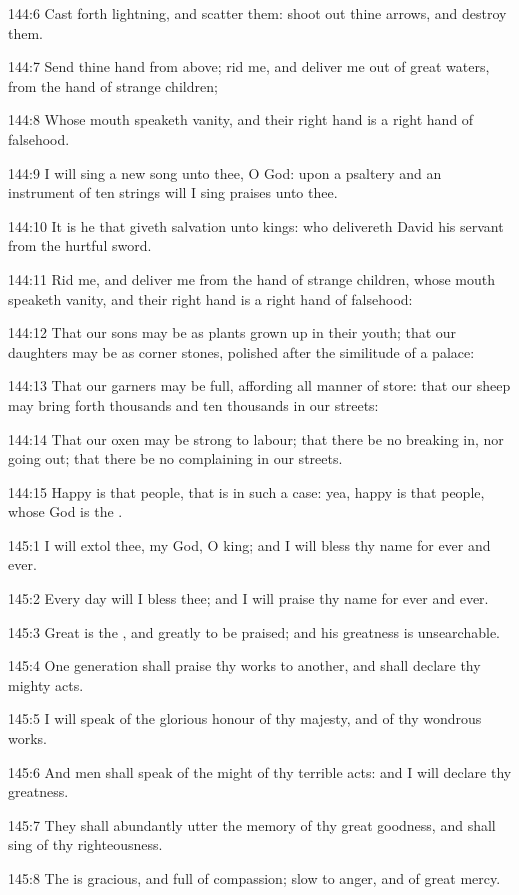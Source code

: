 144:6 Cast forth lightning, and scatter them: shoot out thine arrows, and destroy them.

144:7 Send thine hand from above; rid me, and deliver me out of great waters, from the hand of strange children;

144:8 Whose mouth speaketh vanity, and their right hand is a right hand of falsehood.

144:9 I will sing a new song unto thee, O God: upon a psaltery and an instrument of ten strings will I sing praises unto thee.

144:10 It is he that giveth salvation unto kings: who delivereth David his servant from the hurtful sword.

144:11 Rid me, and deliver me from the hand of strange children, whose mouth speaketh vanity, and their right hand is a right hand of falsehood:

144:12 That our sons may be as plants grown up in their youth; that our daughters may be as corner stones, polished after the similitude of a palace:

144:13 That our garners may be full, affording all manner of store: that our sheep may bring forth thousands and ten thousands in our streets:

144:14 That our oxen may be strong to labour; that there be no breaking in, nor going out; that there be no complaining in our streets.

144:15 Happy is that people, that is in such a case: yea, happy is that people, whose God is the \LORD.



145:1 I will extol thee, my God, O king; and I will bless thy name for ever and ever.

145:2 Every day will I bless thee; and I will praise thy name for ever and ever.

145:3 Great is the \LORD, and greatly to be praised; and his greatness is unsearchable.

145:4 One generation shall praise thy works to another, and shall declare thy mighty acts.

145:5 I will speak of the glorious honour of thy majesty, and of thy wondrous works.

145:6 And men shall speak of the might of thy terrible acts: and I will declare thy greatness.

145:7 They shall abundantly utter the memory of thy great goodness, and shall sing of thy righteousness.

145:8 The \LORD is gracious, and full of compassion; slow to anger, and of great mercy.


